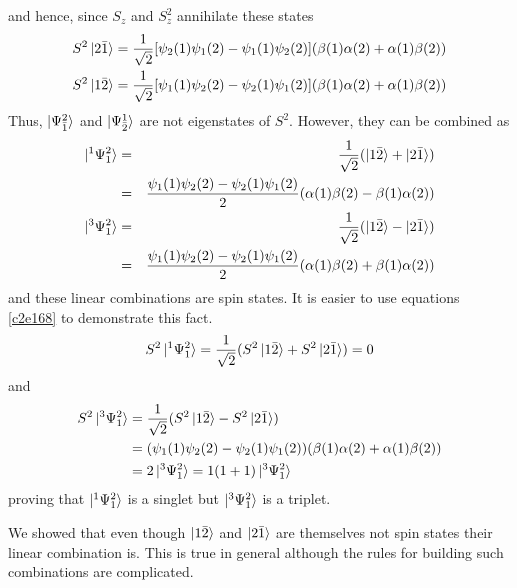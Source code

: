 and hence, since $S_z$ and $S_z^2$ annihilate these states
\begin{equation}\label{c2e168}
\begin{aligned}
S^2\ket{2\bar{1}} &=
\frac{1}{\sqrt{2}}[\psi_2(1)\psi_1(2)-\psi_1(1)\psi_2(2)](\beta(1)\alpha(2) +
\alpha(1)\beta(2)) \\
S^2\ket{1\bar{2}} &=
\frac{1}{\sqrt{2}}[\psi_1(1)\psi_2(2) - \psi_2(1)\psi_1(2)](\beta(1)\alpha(2) +
\alpha(1)\beta(2)) 
\end{aligned}
\end{equation}
Thus, $\ket{\Psi_{\bar{1}}^2}$ and $\ket{\Psi^1_{\bar{2}}}$ are not eigenstates
of $S^2$. 
However, they can be combined as
\begin{eqnarray}
\ket{^1\Psi_1^2} &=& \frac{1}{\sqrt{2}}(\ket{1\bar{2}} + \ket{2\bar{1}})
\nonumber \\
 &=& \frac{\psi_1(1)\psi_2(2)-\psi_2(1)\psi_1(2)}{2}(\alpha(1)\beta(2) -
\beta(1)\alpha(2)) \label{c2e169} \\
\ket{^3\Psi_1^2} &=& \frac{1}{\sqrt{2}}(\ket{1\bar{2}} - \ket{2\bar{1}})
\nonumber \\
 &=& \frac{\psi_1(1)\psi_2(2)-\psi_2(1)\psi_1(2)}{2}(\alpha(1)\beta(2) +
\beta(1)\alpha(2)) \label{c2e170} 
\end{eqnarray}
and these linear combinations are spin states. It is easier to use equations
\eqref{c2e168} to demonstrate this fact.
\begin{equation}\label{c2e171}
S^2\ket{^1\Psi_1^2} = \frac{1}{\sqrt{2}}(S^2\ket{1\bar{2}} + S^2\ket{2\bar{1}})
= 0
\end{equation}
and
\begin{equation}\label{c2e172}
\begin{aligned}
S^2\ket{^3\Psi_1^2}&= \frac{1}{\sqrt{2}}(S^2\ket{1\bar{2}} - S^2\ket{2\bar{1}})
\\
&= (\psi_1(1)\psi_2(2) - \psi_2(1)\psi_1(2))(\beta(1)\alpha(2) +
\alpha(1)\beta(2)) \\
&= 2\ket{^3\Psi_1^2} = 1(1 + 1)\ket{^3\Psi_1^2}
\end{aligned}
\end{equation}
proving that $\ket{^1\Psi_1^2}$ is a singlet but $\ket{^3\Psi_1^2}$ is a
triplet.

We showed that even though $\ket{1\bar{2}}$ and $\ket{2\bar{1}}$ are themselves
not spin states their linear combination is. This is true in general although
the rules for building such combinations are complicated.


